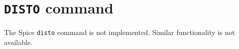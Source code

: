 \section{{\tt DISTO} command}
The Spice {\tt disto} command is not implemented.  Similar functionality is
not available.
